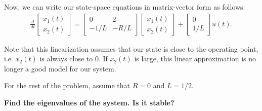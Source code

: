 \begin{enumerate}
{        Now, we can write our state-space equations in matrix-vector form as follows:
        \begin{align*}
            \frac{d}{dt} \begin{bmatrix}
                x_1(t) \\ x_2(t)
            \end{bmatrix} =
            \begin{bmatrix}
                0 & 2 \\
                -1/L & -R/L
            \end{bmatrix} \begin{bmatrix}
                x_1(t) \\ x_2(t)
            \end{bmatrix} + 
            \begin{bmatrix}
                0 \\ 1/L
            \end{bmatrix} u(t).
        \end{align*}  

        Note that this linearization assumes that our state is close to the operating point, i.e. $x_2(t)$ is always close to 0. If $x_2(t)$ is large, this linear approximation is no longer a good model for our system.      
    }

    \qitem For the rest of the problem, assume that $R = 0$ and $L = 1/2$.

    \textbf{Find the eigenvalues of the system. Is it stable?}

\end{enumerate}
